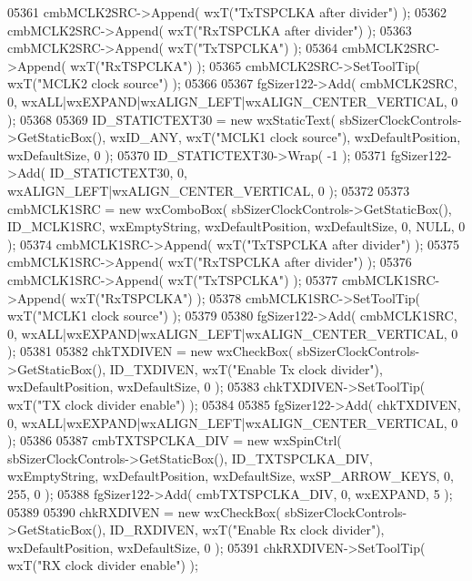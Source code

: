 \begin{DoxyCode}
05361     cmbMCLK2SRC->Append( wxT(\textcolor{stringliteral}{"TxTSPCLKA after divider"}) );
05362     cmbMCLK2SRC->Append( wxT(\textcolor{stringliteral}{"RxTSPCLKA after divider"}) );
05363     cmbMCLK2SRC->Append( wxT(\textcolor{stringliteral}{"TxTSPCLKA"}) );
05364     cmbMCLK2SRC->Append( wxT(\textcolor{stringliteral}{"RxTSPCLKA"}) );
05365     cmbMCLK2SRC->SetToolTip( wxT(\textcolor{stringliteral}{"MCLK2 clock source"}) );
05366     
05367     fgSizer122->Add( cmbMCLK2SRC, 0, wxALL|wxEXPAND|wxALIGN\_LEFT|wxALIGN\_CENTER\_VERTICAL, 0 );
05368     
05369     ID_STATICTEXT30 = \textcolor{keyword}{new} wxStaticText( sbSizerClockControls->GetStaticBox(), wxID\_ANY, wxT(\textcolor{stringliteral}{"MCLK1 clock
       source"}), wxDefaultPosition, wxDefaultSize, 0 );
05370     ID_STATICTEXT30->Wrap( -1 );
05371     fgSizer122->Add( ID_STATICTEXT30, 0, wxALIGN\_LEFT|wxALIGN\_CENTER\_VERTICAL, 0 );
05372     
05373     cmbMCLK1SRC = \textcolor{keyword}{new} wxComboBox( sbSizerClockControls->GetStaticBox(), 
      ID_MCLK1SRC, wxEmptyString, wxDefaultPosition, wxDefaultSize, 0, NULL, 0 );
05374     cmbMCLK1SRC->Append( wxT(\textcolor{stringliteral}{"TxTSPCLKA after divider"}) );
05375     cmbMCLK1SRC->Append( wxT(\textcolor{stringliteral}{"RxTSPCLKA after divider"}) );
05376     cmbMCLK1SRC->Append( wxT(\textcolor{stringliteral}{"TxTSPCLKA"}) );
05377     cmbMCLK1SRC->Append( wxT(\textcolor{stringliteral}{"RxTSPCLKA"}) );
05378     cmbMCLK1SRC->SetToolTip( wxT(\textcolor{stringliteral}{"MCLK1 clock source"}) );
05379     
05380     fgSizer122->Add( cmbMCLK1SRC, 0, wxALL|wxEXPAND|wxALIGN\_LEFT|wxALIGN\_CENTER\_VERTICAL, 0 );
05381     
05382     chkTXDIVEN = \textcolor{keyword}{new} wxCheckBox( sbSizerClockControls->GetStaticBox(), 
      ID_TXDIVEN, wxT(\textcolor{stringliteral}{"Enable Tx clock divider"}), wxDefaultPosition, wxDefaultSize, 0 );
05383     chkTXDIVEN->SetToolTip( wxT(\textcolor{stringliteral}{"TX clock divider enable"}) );
05384     
05385     fgSizer122->Add( chkTXDIVEN, 0, wxALL|wxEXPAND|wxALIGN\_LEFT|wxALIGN\_CENTER\_VERTICAL, 0 );
05386     
05387     cmbTXTSPCLKA_DIV = \textcolor{keyword}{new} wxSpinCtrl( sbSizerClockControls->GetStaticBox(), 
      ID_TXTSPCLKA_DIV, wxEmptyString, wxDefaultPosition, wxDefaultSize, wxSP\_ARROW\_KEYS, 0, 255, 0 );
05388     fgSizer122->Add( cmbTXTSPCLKA_DIV, 0, wxEXPAND, 5 );
05389     
05390     chkRXDIVEN = \textcolor{keyword}{new} wxCheckBox( sbSizerClockControls->GetStaticBox(), 
      ID_RXDIVEN, wxT(\textcolor{stringliteral}{"Enable Rx clock divider"}), wxDefaultPosition, wxDefaultSize, 0 );
05391     chkRXDIVEN->SetToolTip( wxT(\textcolor{stringliteral}{"RX clock divider enable"}) );

\end{DoxyCode}
